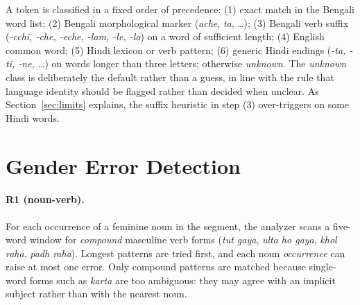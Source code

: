 \documentclass[11pt,a4paper]{report}
\begin{document}
A token is classified in a fixed order of precedence: (1) exact match in the Bengali word list; (2) Bengali morphological marker (\textit{ache}, \textit{ta}, \ldots); (3) Bengali verb suffix (\textit{-cchi, -che, -eche, -lam, -le, -lo}) on a word of sufficient length; (4) English common word; (5) Hindi lexicon or verb pattern; (6) generic Hindi endings (\textit{-ta, -ti, -ne, \ldots}) on words longer than three letters; otherwise \emph{unknown}. The \emph{unknown} class is deliberately the default rather than a guess, in line with the rule that language identity should be flagged rather than decided when unclear. As Section~\ref{sec:limits} explains, the suffix heuristic in step (3) over-triggers on some Hindi words.

\section{Gender Error Detection}

\paragraph{R1 (noun-verb).} For each occurrence of a feminine noun in the segment, the analyzer scans a five-word window for \emph{compound} masculine verb forms (\textit{tut gaya}, \textit{ulta ho gaya}, \textit{khol raha}, \textit{padh raha}). Longest patterns are tried first, and each noun \emph{occurrence} can raise at most one error. Only compound patterns are matched because single-word forms such as \textit{karta} are too ambiguous: they may agree with an implicit subject rather than with the nearest noun.
\end{document}
